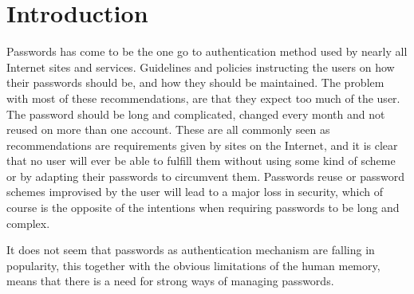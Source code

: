 \chapter{Introduction}
\label{chp:intro} 
Passwords has come to be the one go to authentication method used by nearly all Internet sites and services. Guidelines and policies instructing the users on how their passwords should be, and how they should be maintained. The problem with most of these recommendations, are that they expect too much of the user. The password should be long and complicated, changed every month and not reused on more than one account. These are all commonly seen as recommendations are requirements given by sites on the Internet, and it is clear that no user will ever be able to fulfill them without using some kind of scheme or by adapting their passwords to circumvent them. Passwords reuse or password schemes improvised by the user will lead to a major loss in security, which of course is the opposite of the intentions when requiring passwords to be long and complex. 
\par It does not seem that passwords as authentication mechanism are falling in popularity, this together with the obvious limitations of the human memory, means that there is a need for strong ways of managing passwords. 


